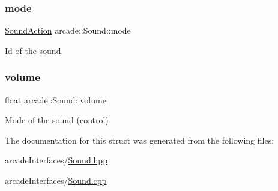 \mbox{\label{structarcade_1_1_sound_a67fc0884cb4d9445ad6c9d9a241a15ef}} 
\subsubsection{\texorpdfstring{mode}{mode}}
{\footnotesize\ttfamily \hyperlink{namespacearcade_a31ef30225775697d1aeaf59819ac5051}{Sound\+Action} arcade\+::\+Sound\+::mode}



Id of the sound. 

\mbox{\label{structarcade_1_1_sound_aa80e8832313b76cefcf2e866c4a2e1cc}} 
\subsubsection{\texorpdfstring{volume}{volume}}
{\footnotesize\ttfamily float arcade\+::\+Sound\+::volume}



Mode of the sound (control) 



The documentation for this struct was generated from the following files\+:\begin{DoxyCompactItemize}
\item 
arcade\+Interfaces/\hyperlink{_sound_8hpp}{Sound.\+hpp}\item 
arcade\+Interfaces/\hyperlink{_sound_8cpp}{Sound.\+cpp}\end{DoxyCompactItemize}
